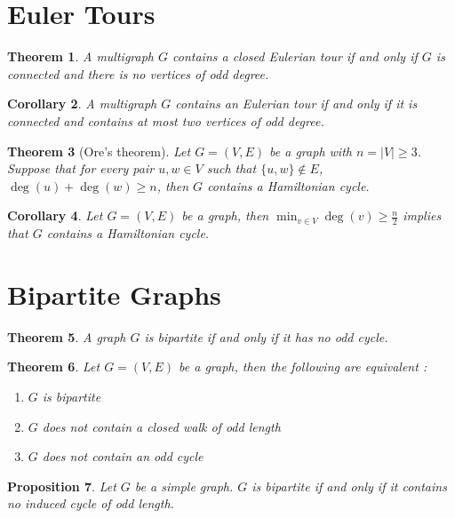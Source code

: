 \documentclass[paper=a4, fontsize=12pt]{scrartcl} %
\newtheorem{thm}{Theorem}[section]
\newtheorem{cor}[thm]{Corollary}
\newtheorem{prop}[thm]{Proposition}
\theoremstyle{definition}
\theoremstyle{remark}
\numberwithin{equation}{section} %
\numberwithin{figure}{section} %
\numberwithin{table}{section} %
\begin{document}
\section{Euler Tours}
\begin{thm}
	A multigraph $G$ contains a closed Eulerian tour if and only if $G$ is connected and there is no vertices of odd degree.
\end{thm}
\begin{cor}
	A multigraph $G$ contains an Eulerian tour if and only if it is connected and contains at most two vertices of odd degree.
\end{cor}
\begin{thm}[Ore's theorem]
	Let $G = (V,E)$ be a graph with $n = |V| \geq 3$. Suppose that for every pair $u,w \in V$ such that $\{u,w\} \notin E$, $\deg(u) + \deg(w) \geq n$, then $G$ contains a Hamiltonian cycle.
\end{thm}
\begin{cor}
	Let $G = (V,E)$ be a graph, then $\min_{v \in V} \deg(v) \geq \frac{n}{2}$ implies that $G$ contains a Hamiltonian cycle.
\end{cor}
\section{Bipartite Graphs}
\begin{thm}
	A graph $G$ is bipartite if and only if it has no odd cycle.
\end{thm}
\begin{thm}
	Let $G = (V,E)$ be a graph, then the following are equivalent :
	\begin{enumerate}
		\item $G$ is bipartite
		\item $G$ does not contain a closed walk of odd length
		\item $G$ does not contain an odd cycle
	\end{enumerate}
\end{thm}
\begin{prop}
	Let $G$ be a simple graph. $G$ is bipartite if and only if it contains no induced cycle of odd length.
\end{prop}
\end{document}
